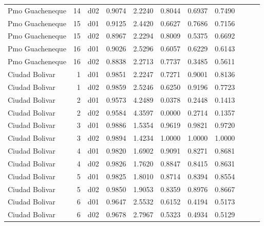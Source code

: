 \begin{landscape}
\begin{longtable}{p{2cm}rrrrrrrrrr}
      Pmo Guacheneque  &         14 &     d02 &   0.9074 &  2.2240 &        0.8044 &           0.6937 &  0.7490 \\
      Pmo Guacheneque  &         15 &     d01 &   0.9125 &  2.4420 &        0.6627 &           0.7686 &  0.7156 \\
      Pmo Guacheneque  &         15 &     d02 &   0.8967 &  2.2294 &        0.8009 &           0.5375 &  0.6692 \\
      Pmo Guacheneque  &         16 &     d01 &   0.9026 &  2.5296 &        0.6057 &           0.6229 &  0.6143 \\
      Pmo Guacheneque  &         16 &     d02 &   0.8838 &  2.2713 &        0.7737 &           0.3485 &  0.5611 \\
       Ciudad Bolivar  &          1 &     d01 &   0.9851 &  2.2247 &        0.7271 &           0.9001 &  0.8136 \\
       Ciudad Bolivar  &          1 &     d02 &   0.9859 &  2.5246 &        0.6250 &           0.9196 &  0.7723 \\
       Ciudad Bolivar  &          2 &     d01 &   0.9573 &  4.2489 &        0.0378 &           0.2448 &  0.1413 \\
       Ciudad Bolivar  &          2 &     d02 &   0.9584 &  4.3597 &        0.0000 &           0.2714 &  0.1357 \\
       Ciudad Bolivar  &          3 &     d01 &   0.9886 &  1.5354 &        0.9619 &           0.9821 &  0.9720 \\
       Ciudad Bolivar  &          3 &     d02 &   0.9894 &  1.4234 &        1.0000 &           1.0000 &  1.0000 \\
       Ciudad Bolivar  &          4 &     d01 &   0.9820 &  1.6902 &        0.9091 &           0.8271 &  0.8681 \\
       Ciudad Bolivar  &          4 &     d02 &   0.9826 &  1.7620 &        0.8847 &           0.8415 &  0.8631 \\
       Ciudad Bolivar  &          5 &     d01 &   0.9825 &  1.8010 &        0.8714 &           0.8394 &  0.8554 \\
       Ciudad Bolivar  &          5 &     d02 &   0.9850 &  1.9053 &        0.8359 &           0.8976 &  0.8667 \\
       Ciudad Bolivar  &          6 &     d01 &   0.9647 &  2.5532 &        0.6152 &           0.4194 &  0.5173 \\
       Ciudad Bolivar  &          6 &     d02 &   0.9678 &  2.7967 &        0.5323 &           0.4934 &  0.5129 \\

\end{longtable}
\end{landscape}
